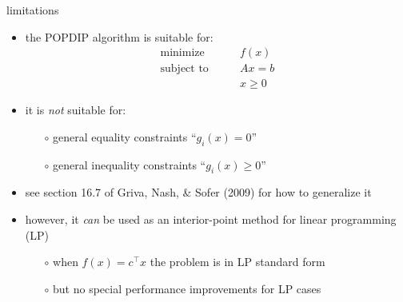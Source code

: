 \documentclass[10pt,hyperref,dvipsnames]{beamer}
\begin{document}
\begin{frame}{limitations}

\begin{itemize}
\item the POPDIP algorithm is suitable for:
\begin{equation*}
\begin{matrix}
\text{minimize} \qquad   & f(x) \\
\text{subject to} \qquad & A x = b \\
                         & x \ge 0
\end{matrix}
\end{equation*}
\item it is \emph{not} suitable for:
    \begin{itemize}
    \item[$\circ$] general equality constraints ``$g_i(x)=0$''
    \item[$\circ$] general inequality constraints ``$g_i(x)\ge 0$''
    \end{itemize}
\item see section 16.7 of Griva, Nash, \& Sofer (2009) for how to generalize it

\medskip
\item however, it \emph{can} be used as an interior-point method for linear programming (LP)
    \begin{itemize}
    \item[$\circ$] when $f(x)=c^\top x$ the problem is in LP standard form
    \item[$\circ$] but no special performance improvements for LP cases
    \end{itemize}
\end{itemize}
\end{frame}
\end{document}
